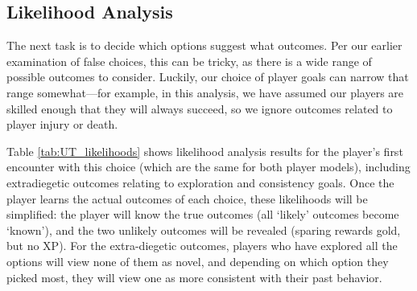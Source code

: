 \documentclass[arts,article,submit,moreauthors,pdftex,10pt,a4paper]{Definitions/mdpi}
\begin{document}
\subsection{Likelihood Analysis}

The next task is to decide which options suggest what outcomes.
%
Per our earlier examination of false choices, this can be tricky, as there is a wide range of possible outcomes to consider.
%
Luckily, our choice of player goals can narrow that range somewhat---for example, in this analysis, we have assumed our players are skilled enough that they will always succeed, so we ignore outcomes related to player injury or death.


Table \ref{tab:UT_likelihoods} shows likelihood analysis results for the player's first encounter with this choice (which are the same for both player models), including extradiegetic outcomes relating to exploration and consistency goals.
%
Once the player learns the actual outcomes of each choice, these likelihoods will be simplified: the player will know the true outcomes (all `likely' outcomes become `known'), and the two unlikely outcomes will be revealed (sparing rewards gold, but no XP).
%
For the extra-diegetic outcomes, players who have explored all the options will view none of them as novel, and depending on which option they picked most, they will view one as more consistent with their past behavior.
\end{document}

